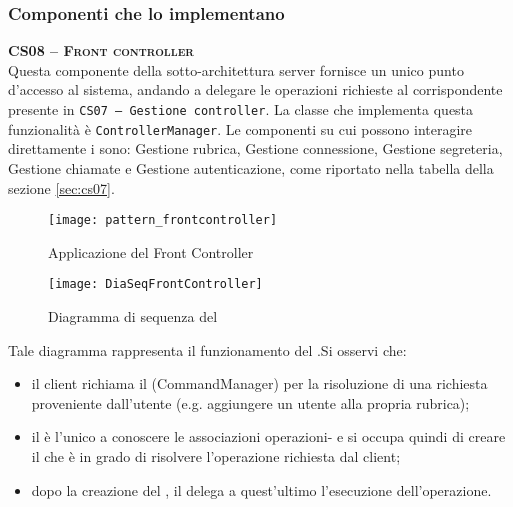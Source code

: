 \subsubsection{Componenti che lo implementano}
\begin{description}
  \item{\scshape\bfseries CS08 -- Front controller}\\
Questa componente della sotto-architettura server fornisce un unico punto d'accesso al sistema, andando a delegare le operazioni richieste al corrispondente  presente in \texttt{CS07 -- Gestione controller}. La classe che implementa questa funzionalità è \texttt{ControllerManager}. Le componenti su cui possono interagire direttamente i  sono: \textsf{Gestione rubrica}, \textsf{Gestione connessione}, \textsf{Gestione segreteria}, \textsf{Gestione chiamate} e \textsf{Gestione autenticazione}, come riportato nella tabella della sezione \vref{sec:cs07}.
\end{description}


\begin{figure}[H]
  \centering
  \texttt{[image: pattern\_frontcontroller]}
  \caption{Applicazione del  Front Controller}\label{fig:dao}
\end{figure}



\begin{figure}[H]
  \centering
  \texttt{[image: DiaSeqFrontController]}
  \caption{Diagramma di sequenza del }\label{fig:front_controller_seq}
\end{figure}

Tale diagramma rappresenta il funzionamento del .Si osservi che:
	\begin{itemize}
		\item il client richiama il  (CommandManager) per la risoluzione di una richiesta proveniente dall'utente (e.g. aggiungere un utente alla propria rubrica);
		\item il  è l'unico a conoscere le associazioni operazioni- e si occupa quindi di creare il  che è in grado di risolvere l'operazione richiesta dal client;
		\item dopo la creazione del , il  delega a quest'ultimo l'esecuzione dell'operazione.
	\end{itemize}

